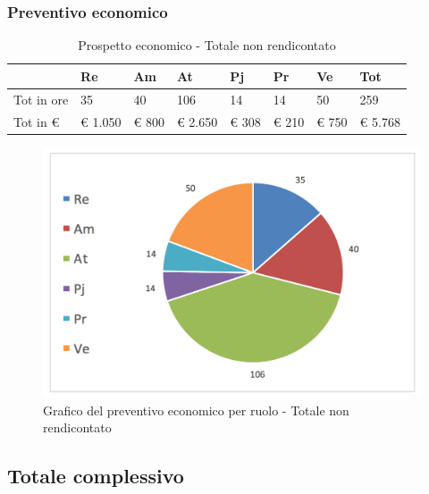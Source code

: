			\subsubsection {Preventivo economico}
			\begin{table}[H] \begin{center} \begin{tabular}{llllllll}
			\toprule
				&	\textbf{Re}	&	\textbf{Am}	&	\textbf{At}	&	\textbf{Pj}	&	\textbf{Pr}	&	\textbf{Ve}	&	\textbf{Tot}\\

			\midrule
			Tot in ore	&	35	&	40	&	106	&	14	&	14	&	50	&	259	 \\


			Tot in €	&	 €        1.050 	 & 	 €        800 	 & 	 €        2.650 	 & 	 €        308 	 & 	 €            210 	 & 	 €        750 	 & 	 €              5.768 	 \\
			\bottomrule
			\end{tabular} \end{center} \caption{Prospetto economico -
			Totale non rendicontato
			}\label{tab:s_TotaleNonRendicontato_prev} \end{table}
			\begin{figure}[H]
			\centering
			\includegraphics[scale=0.40]{img/s_TotaleNonRendicontato}
			\caption{Grafico del preventivo economico per ruolo - Totale non rendicontato}
			\label{fig:TotaleNonRendicontato}
			\end{figure}
		\newpage
		\subsection {Totale complessivo}
